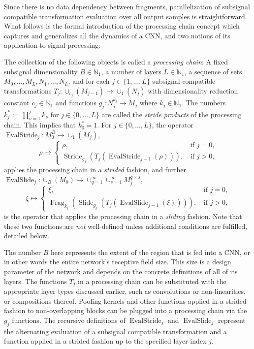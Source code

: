 \documentclass[journal]{IEEEtran}
\newcommand{\N}{\mathbb{N}}
\newcommand{\ROI}{B}
\newcommand{\discint}[2]{\{#1,\dotsc,#2\}}
\newcommand{\inint}[2]{\in\discint{#1}{#2}}
\DeclareMathOperator{\Slide}{Slide}
\DeclareMathOperator{\Stride}{Stride}
\DeclareMathOperator{\Fragmentation}{Frag}
\DeclareMathOperator{\EvalStride}{EvalStride}
\DeclareMathOperator{\EvalSlide}{EvalSlide}
\begin{document}
Since there is no data dependency between fragments, parallelization of subsignal compatible transformation evaluation over all output samples is straightforward.
What follows is the formal introduction of the processing chain concept which captures and generalizes all the dynamics of a CNN, and two notions of its application to signal processing:
\begin{definition}
\label{def:processing-chain}
The collection of the following objects is called a \emph{processing chain}:
A fixed subsignal dimensionality $\ROI\in\N_1$,
a number of layers $L\in\N_1$,
a sequence of sets $M_0,\dotsc,M_{L},N_1,\dotsc,N_L$,
and for each $j\inint{1}{L}$ subsignal compatible transformations $T_j\colon\cup_{c_j}(M_{j - 1})\to\cup_1(N_j)$ with dimensionality reduction constant $c_j\in\N_1$
and functions $g_j\colon N_j^{k_j}\to M_j$ where $k_j\in\N_1$.
The numbers $k_j^* := \prod_{\nu = 1}^j k_\nu$ for $j\inint{0}{L}$ are called the \emph{stride products} of the processing chain.
This implies that $k_0^* = 1$.
For $j\inint{0}{L}$, the operator $\EvalStride_j\colon M_0^\ROI\to\cup_1(M_j)$, 
\begin{displaymath}
  \rho\mapsto
  \begin{cases}
    \rho\text{,} & \text{if } j = 0\text{,}\\
    \Stride_{g_j}(T_j(\EvalStride_{j - 1}(\rho)))\text{, } & \text{if } j > 0\text{,}
  \end{cases}
\end{displaymath}
applies the processing chain in a \emph{strided} fashion, and further $\EvalSlide_j\colon\cup_\ROI(M_0)\to\cup_{q = 1}^\infty\cup_{s = 1}^\infty M_j^{q\times s}$, 
\begin{displaymath}
  \xi\mapsto
  \begin{cases}
    \xi\text{,} & \text{if } j = 0\text{,}\\
    \Fragmentation_{k_j}(\Slide_{g_j}(T_j(\EvalSlide_{j - 1}(\xi))))\text{, } & \text{if } j > 0\text{,}
  \end{cases}
\end{displaymath}
is the operator that applies the processing chain in a \emph{sliding} fashion.
Note that these two functions are \emph{not} well-defined unless additional conditions are fulfilled, detailed below.
\end{definition}

The number $B$ here represents the extent of the region that is fed into a CNN, or in other words the entire network's receptive field size.
This size is a design parameter of the network and depends on the concrete definitions of all of its layers.
The functions $T_j$ in a processing chain can be substituted with the appropriate layer types discussed earlier, such as convolutions or non-linearities, or compositions thereof.
Pooling kernels and other functions applied in a strided fashion to non-overlapping blocks can be plugged into a processing chain via the $g_j$ functions.
The recursive definitions of $\EvalStride_j$ and $\EvalSlide_j$ represent the alternating evaluation of a subsignal compatible transformation and a function applied in a strided fashion up to the specified layer index $j$.
\end{document}
